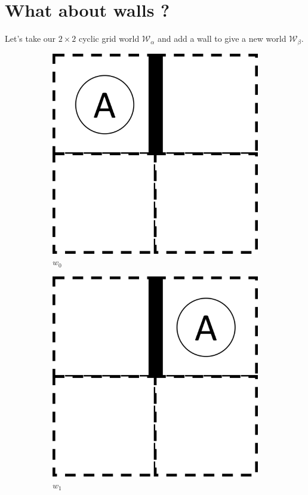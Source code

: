 \section{What about walls ?}

Let's take our $2 \times 2$ cyclic grid world $\mathscr{W}_{\alpha}$ and add a wall to give a new world $\mathscr{W}_{\beta}$.

\begin{figure}[H]
  \centering
    \begin{subfigure}[b]{0.45\linewidth}
        \centering
        \includegraphics[width=0.5\linewidth]{5BeyondSBDRL/GlobalAlgebras/Images/2x2_with_wall_world_states/w0.png}
        \caption{$w_{0}$}
        \vspace{0.25cm}
    \end{subfigure}
    \begin{subfigure}[b]{0.45\linewidth}
        \centering
        \includegraphics[width=0.5\linewidth]{5BeyondSBDRL/GlobalAlgebras/Images/2x2_with_wall_world_states/w1.png}
        \caption{$w_{1}$}
        \vspace{0.25cm}
    \end{subfigure}
    \begin{subfigure}[b]{0.45\linewidth}
        \centering

\end{subfigure}
\end{figure}
